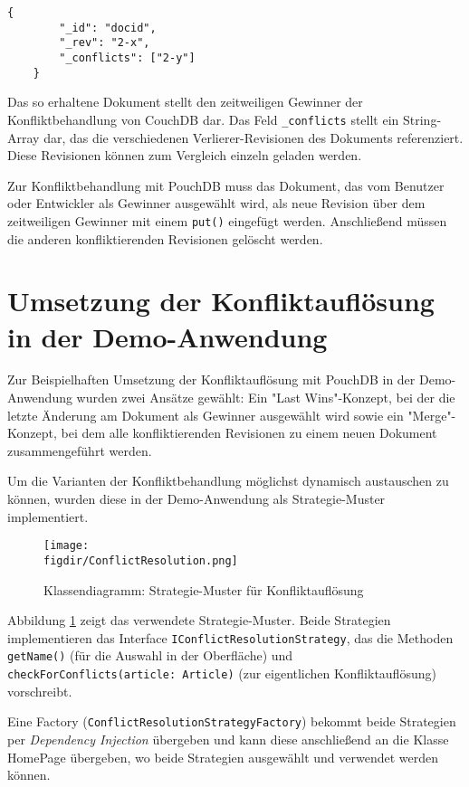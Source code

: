 \begin{codebox}
	\begin{lstlisting}[style=typescript]
	{
		"_id": "docid",
		"_rev": "2-x",
		"_conflicts": ["2-y"]
	}
	\end{lstlisting}
\end{codebox}

Das so erhaltene Dokument stellt den zeitweiligen Gewinner der Konfliktbehandlung von CouchDB dar.
Das Feld \texttt{\_conflicts} stellt ein String-Array dar, das die verschiedenen Verlierer-Revisionen des Dokuments referenziert. Diese Revisionen können zum Vergleich einzeln geladen werden.

Zur Konfliktbehandlung mit PouchDB muss das Dokument, das vom Benutzer oder Entwickler als Gewinner ausgewählt wird, als neue Revision über dem zeitweiligen Gewinner mit einem \texttt{put()} eingefügt werden. Anschließend müssen die anderen konfliktierenden Revisionen gelöscht werden.

\section{Umsetzung der Konfliktauflösung in der Demo-Anwendung}

Zur Beispielhaften Umsetzung der Konfliktauflösung mit PouchDB in der Demo-Anwendung wurden zwei Ansätze gewählt: Ein "Last Wins"-Konzept, bei der die letzte Änderung am Dokument als Gewinner ausgewählt wird sowie ein "Merge"-Konzept, bei dem alle konfliktierenden Revisionen zu einem neuen Dokument zusammengeführt werden.

Um die Varianten der Konfliktbehandlung möglichst dynamisch austauschen zu können, wurden diese in der Demo-Anwendung als Strategie-Muster implementiert.

\begin{figure}[htb]
	\centering
	\caption{Klassendiagramm: Strategie-Muster für Konfliktauflösung}
	\label{fig:conflictresolutionstrategy}
	\texttt{[image: \\figdir/ConflictResolution.png]}
\end{figure}

Abbildung \ref{fig:conflictresolutionstrategy} zeigt das verwendete Strategie-Muster. Beide Strategien implementieren das Interface \texttt{IConflictResolutionStrategy}, das die Methoden \texttt{getName()} (für die Auswahl in der Oberfläche) und \texttt{checkForConflicts(article: Article)} (zur eigentlichen Konfliktauflösung) vorschreibt.

Eine Factory (\texttt{ConflictResolutionStrategyFactory}) bekommt beide Strategien per \emph{Dependency Injection} übergeben und kann diese anschließend an die Klasse HomePage übergeben, wo beide Strategien ausgewählt und verwendet werden können.